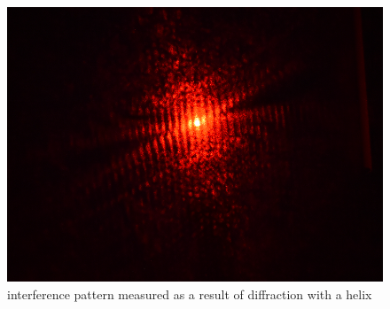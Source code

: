 \begin{figure}[H]
    \centering
    \includegraphics[width=0.9\columnwidth]{figures/expantion meshured interferemce.png}
    \caption{interference pattern measured as a result of diffraction with a helix}
    \label{fig:expansion measured interference pattern}
\end{figure}